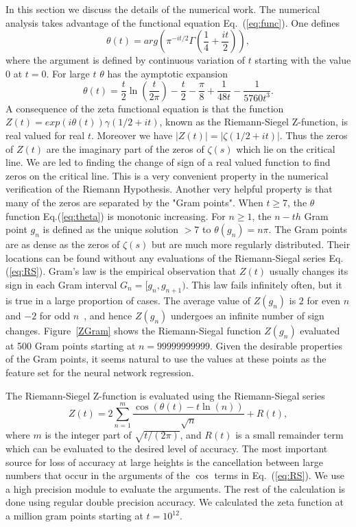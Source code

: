 \documentclass[12pt]{article}
\begin{document}
In this section we discuss the details of the numerical work. 
The numerical analysis takes advantage of the functional 
equation Eq.~(\ref{eq:func}).
One defines
\begin{equation}
\theta(t) = arg (\pi^{−it/2} \Gamma(\frac{1}{4} + \frac{it}{2})), 
\label{eq:theta}
\end{equation}
where the argument is defined by continuous variation of $t$ starting with the value $0$ at $t = 0$.
For large $t$ $\theta$ has the aymptotic expansion
\begin{equation}
\theta(t) = \frac{t}{2}\ln (\frac{t}{2\pi}) - \frac{t}{2} - \frac{\pi}{8} + \frac{1}{48t} - \frac{1}{5760t^3}. 
\label{eq:thetaAsymptotic}
\end{equation}
A consequence of the zeta functional equation is that the function 
$Z(t)=exp(i\theta(t))\gamma(1/2 +it)$,
known as the Riemann-Siegel Z-function, is real valued for real $t$. 
Moreover we have $|Z(t)| = |\zeta(1/2+it)|$. Thus the zeros of $Z(t)$ are the imaginary part of the zeros 
of $\zeta(s)$ which lie on the critical line. We are led to finding the change of sign 
of a real valued function 
to find zeros on the critical line. This is a very convenient property in the numerical verification 
of the Riemann Hypothesis.
Another very helpful property is that many of the zeros are separated by the
"Gram points".  When $t \ge 7$, the $\theta$ function Eq.(\ref{eq:theta}) is monotonic increasing. 
For $n \ge 1$, the $n-th$ Gram point $g_n$ is defined as the unique solution $> 7$ to
$\theta (g_n) = n\pi$.
The Gram points are as dense as the zeros of $\zeta(s)$ but are much more regularly distributed.
Their locations can be found without any evaluations of the Riemann-Siegal series Eq.(\ref{eq:RS}).
Gram's law is the empirical observation that $Z(t)$ usually changes its sign in each Gram interval 
$G_n = [g_n,g_{n+1})$. 
This law fails infinitely often, but it is true in a large proportion of cases.
The average value of $Z(g_n)$ is $2$ for even $n$ and $-2$ for odd $n$~\cite{Titchmarsh(1986)},
and hence $Z(g_n)$ undergoes an infinite number of sign changes.
Figure~\ref{ZGram} shows the Riemann-Siegal function $Z(g_n)$ evaluated at 500 Gram points
starting at $n=99999999999$. Given the desirable properties of the Gram points, it seems 
natural to use the values at these points as the feature set for the neural network regression.


The Riemann-Siegel Z-function is evaluated using the Riemann-Siegal series
\begin{equation}
Z(t) = 2\sum^{m}_{n=1}\frac{\cos(\theta(t) - t \ln (n))}{\sqrt{n}} + R(t), 
\label{eq:RS}
\end{equation}
where $m$ is the integer part of $\sqrt{t/(2\pi)}$, and $R(t)$ is a small remainder
term which can be evaluated to the desired level of accuracy. The most important 
source for loss of accuracy at large heights is the cancellation between
large numbers that occur in the arguments of the $\cos$ terms in Eq.~(\ref{eq:RS}). We 
use a high precision module to evaluate the arguments. The rest of the calculation
is done using regular double precision accuracy. 
We calculated the zeta function at a million gram points starting at $t = 10^{12}$.
\end{document}
